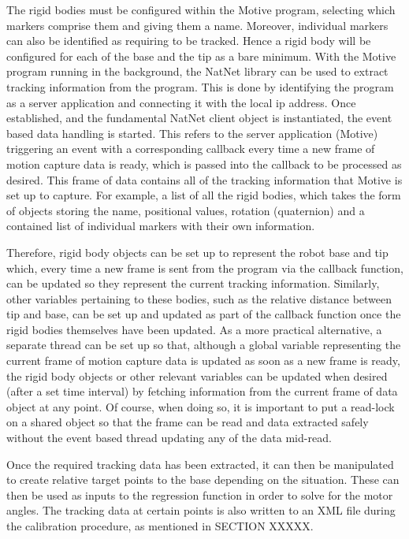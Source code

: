 \documentclass[11pt]{article}
\begin{document}
The rigid bodies must be configured within the Motive program, selecting which markers comprise them and giving them a name. Moreover, individual markers can also be identified as requiring to be tracked. Hence a rigid body will be configured for each of the base and the tip as a bare minimum. With the Motive program running in the background, the NatNet library can be used to extract tracking information from the program. This is done by identifying the program as a server application and connecting it with the local ip address. Once established, and the fundamental NatNet client object is instantiated, the event based data handling is started. This refers to the server application (Motive) triggering an event with a corresponding callback every time a new frame of motion capture data is ready, which is passed into the callback to be processed as desired. This frame of data contains all of the tracking information that Motive is set up to capture. For example, a list of all the rigid bodies, which takes the form of objects storing the name, positional values, rotation (quaternion) and a contained list of individual markers with their own information.

Therefore, rigid body objects can be set up to represent the robot base and tip which, every time a new frame is sent from the program via the callback function, can be updated so they represent the current tracking information. Similarly, other variables pertaining to these bodies, such as the relative distance between tip and base, can be set up and updated as part of the callback function once the rigid bodies themselves have been updated. As a more practical alternative, a separate thread can be set up so that, although a global variable representing the current frame of motion capture data is updated as soon as a new frame is ready, the rigid body objects or other relevant variables can be updated when desired (after a set time interval) by fetching information from the current frame of data object at any point. Of course, when doing so, it is important to put a read-lock on a shared object so that the frame can be read and data extracted safely without the event based thread updating any of the data mid-read.

Once the required tracking data has been extracted, it can then be manipulated to create relative target points to the base depending on the situation. These can then be used as inputs to the regression function in order to solve for the motor angles. The tracking data at certain points is also written to an XML file during the calibration procedure, as mentioned in SECTION XXXXX. 
\end{document}
